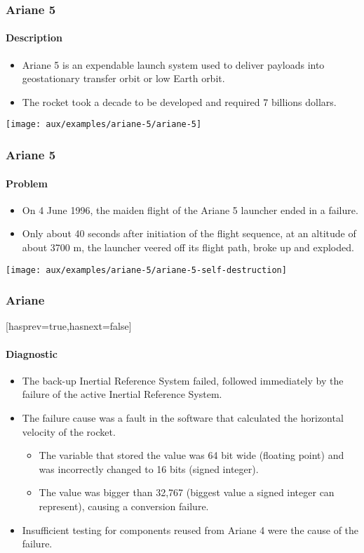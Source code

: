 \begin{frame}[hasprev=false,hasnext=true]
\label{example:ariane-5}
\frametitle{Ariane 5}
\framesubtitle{Description}

\begin{itemize}
	\item Ariane 5 is an expendable launch system used to deliver payloads into
	geostationary transfer orbit or low Earth orbit.

	\item The rocket took a decade to be developed and required 7 billions
	dollars.
\end{itemize}

\begin{block:ie}{}
	\centering
	\texttt{[image: aux/examples/ariane-5/ariane-5]}
\end{block:ie}
\end{frame}


\begin{frame}[hasprev=true,hasnext=true]
\frametitle{Ariane 5}
\framesubtitle{Problem}

\begin{itemize}
	\item On 4 June 1996, the maiden flight of the Ariane 5 launcher ended in a
	failure.

	\item Only about 40 seconds after initiation of the flight sequence, at an
	altitude of about 3700 m, the launcher veered off its flight path, broke up
	and exploded.
\end{itemize}

\begin{block:ie}{}
	\centering
	\texttt{[image: aux/examples/ariane-5/ariane-5-self-destruction]}
\end{block:ie}
\end{frame}


\begin{frame}
\frametitle{Ariane}[hasprev=true,hasnext=false]
\framesubtitle{Diagnostic}

\begin{itemize}
	\item The back-up Inertial Reference System failed, followed immediately by
	the failure of the active Inertial Reference System.

	\item The failure cause was a fault in the software that calculated the
	horizontal velocity of the rocket.
	\begin{itemize}
		\item The variable that stored the value was 64 bit wide (floating
		point) and was incorrectly changed to 16 bits (signed integer).

		\item The value was bigger than 32,767 (biggest value a signed integer
		can represent), causing a conversion failure.
	\end{itemize}

	\item Insufficient testing for components reused from Ariane 4 were the
	cause of the failure.
\end{itemize}
\end{frame}